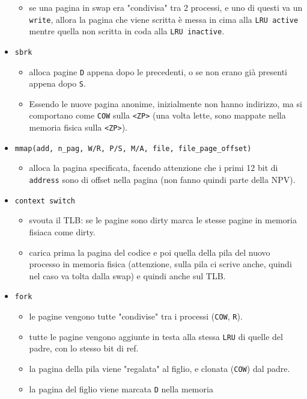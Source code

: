 \documentclass[12pt, a4paper]{report}
\begin{document}
\begin{itemize}
\begin{itemize}
			\item se una pagina in swap era "condivisa" tra 2 processi, e uno di
				questi va un \texttt{write}, allora la pagina che viene scritta
				è messa in cima alla \texttt{LRU active} mentre quella non
				scritta in coda alla \texttt{LRU inactive}.
		\end{itemize}
	\item \texttt{sbrk}
		\begin{itemize}
			\item alloca pagine \texttt{D} appena dopo le precedenti, o se non
				erano già presenti appena dopo \texttt{S}.
			\item Essendo le nuove pagina anonime, inizialmente non hanno
				indirizzo, ma si comportano come \texttt{COW} sulla
				\texttt{<ZP>} (una volta lette, sono mappate nella memoria
				fisica sulla \texttt{<ZP>}).
		\end{itemize}
	\item \texttt{mmap(add, n\_pag, W/R, P/S, M/A, file, file\_page\_offset)}
		\begin{itemize}
			\item alloca la pagina specificata, facendo attenzione che i primi
				12 bit di \texttt{address} sono di offset nella pagina (non fanno
				quindi parte della NPV).
		\end{itemize}
	\item \texttt{context switch}
		\begin{itemize}
			\item svouta il TLB: se le pagine sono dirty marca le stesse pagine
				in memoria fisiaca come dirty.
			\item carica prima la pagina del codice e poi quella della pila del
				nuovo processo in memoria fisica (attenzione, sulla pila ci
				scrive anche, quindi nel caso va tolta dalla swap) e quindi
		anche sul TLB. \end{itemize}
	\item \texttt{fork}
		\begin{itemize}
			\item le pagine vengono tutte "condivise" tra i processi
				(\texttt{COW}, \texttt{R}).
			\item tutte le pagine vengono aggiunte in testa alla stessa
				\texttt{LRU} di quelle del padre, con lo stesso bit di ref.
			\item la pagina della pila viene "regalata" al figlio, e clonata
				(\texttt{COW}) dal padre.
			\item la pagina del figlio viene marcata \texttt{D} nella memoria

\end{itemize}
\end{itemize}
\end{document}
